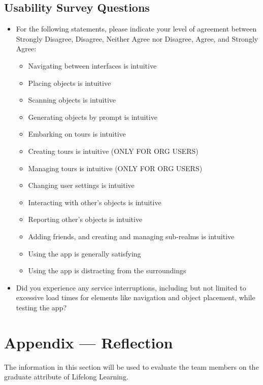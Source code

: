 \documentclass[12pt, titlepage]{article}
\begin{document}
\subsection{Usability Survey Questions} \label{sub:usability_survey}

\begin{itemize}
    \item For the following statements, please indicate your level of agreement between Strongly Disagree, Disagree, Neither Agree nor Disagree, Agree, and Strongly Agree:
    \begin{itemize}
        \item Navigating between interfaces is intuitive
        \item Placing objects is intuitive
        \item Scanning objects is intuitive
        \item Generating objects by prompt is intuitive
        \item Embarking on tours is intuitive
        \item Creating tours is intuitive (ONLY FOR ORG USERS)
        \item Managing tours is intuitive (ONLY FOR ORG USERS)
        \item Changing user settings is intuitive
        \item Interacting with other's objects is intuitive
        \item Reporting other's objects is intuitive
        \item Adding friends, and creating and managing sub-realms is intuitive
        \item Using the app is generally satisfying
        \item Using the app is distracting from the surroundings
    \end{itemize}
    \item Did you experience any service interruptions, including but not limited to excessive load times for elements like navigation and object placement, while testing the app? \\
\end{itemize}

\newpage{}
\section*{Appendix --- Reflection}

The information in this section will be used to evaluate the team members on the
graduate attribute of Lifelong Learning.
\end{document}
